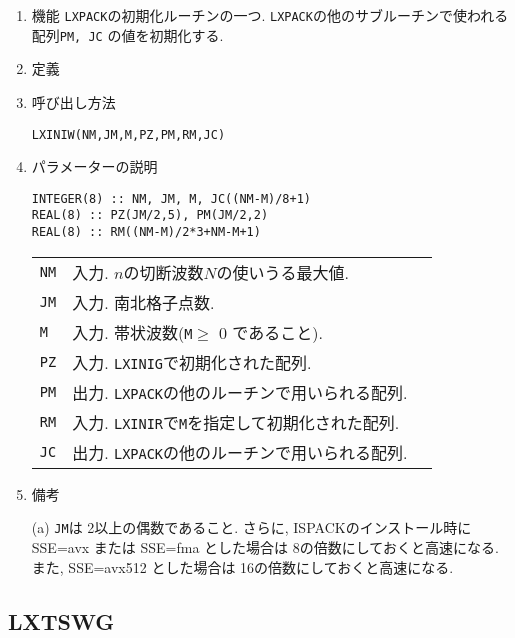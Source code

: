 \documentclass[a4j]{jarticle}
\begin{document}
\begin{enumerate}

\item 機能
\texttt{LXPACK}の初期化ルーチンの一つ.
\texttt{LXPACK}の他のサブルーチンで使われる配列\texttt{PM, JC}
の値を初期化する.

\item 定義

\item 呼び出し方法 
    
\texttt{LXINIW(NM,JM,M,PZ,PM,RM,JC)}
  
\item パラメーターの説明

\begin{verbatim}
INTEGER(8) :: NM, JM, M, JC((NM-M)/8+1)
REAL(8) :: PZ(JM/2,5), PM(JM/2,2)
REAL(8) :: RM((NM-M)/2*3+NM-M+1)
\end{verbatim}
    
\begin{tabular}{lll}
\texttt{NM} & 入力. $n$の切断波数$N$の使いうる最大値.\\
\texttt{JM} & 入力. 南北格子点数.\\  
\texttt{M} & 入力. 帯状波数(\texttt{M}$\ge$ 0 であること).\\
\texttt{PZ}  & 入力. \texttt{LXINIG}で初期化された配列.\\
\texttt{PM}  & 出力. \texttt{LXPACK}の他のルーチンで用いられる配列.\\
\texttt{RM}  & 入力. \texttt{LXINIR}で\texttt{M}を指定して初期化された配列.\\
\texttt{JC}  & 出力. \texttt{LXPACK}の他のルーチンで用いられる配列.
\end{tabular}

\item 備考

(a) \texttt{JM}は 2以上の偶数であること. さらに, ISPACKのインストール時に
SSE=avx または SSE=fma とした場合は 8の倍数にしておくと高速になる.
また, SSE=avx512 とした場合は 16の倍数にしておくと高速になる.

\end{enumerate}


\subsection{LXTSWG}
\end{document}

